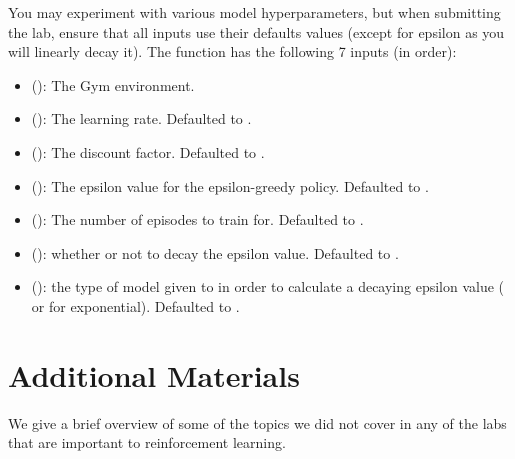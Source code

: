 \begin{problem}
    You may experiment with various model hyperparameters, but when submitting the lab, ensure that all inputs use their defaults values (except for epsilon as you will linearly decay it).
    The function  has the following 7 inputs (in order):
    \begin{itemize}
        \item {} (): The Gym environment.
        \item {} (): The learning rate. Defaulted to .
        \item {} (): The discount factor. Defaulted to .
        \item {} (): The epsilon value for the epsilon-greedy policy. Defaulted to .
        \item {} (): The number of episodes to train for. Defaulted to .
        \item {} (): whether or not to decay the epsilon value. Defaulted to .
        \item {} (): the type of model given to  in order to calculate a decaying epsilon value ( or  for exponential). Defaulted to .
    \end{itemize}

\end{problem}

\section*{Additional Materials}
We give a brief overview of some of the topics we did not cover in any of the labs that are important to reinforcement learning.

